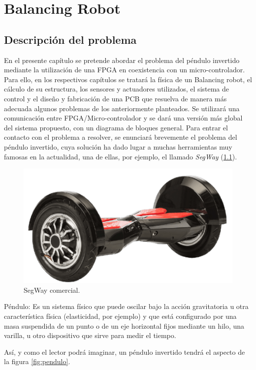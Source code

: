 \chapter{Balancing Robot}\label{sec: BalancingRobot}
\section{Descripción del problema}
En el presente capítulo se pretende abordar el problema del péndulo invertido mediante la utilización de una FPGA en coexistencia con un micro-controlador. Para ello, en los respectivos capítulos se tratará la física de un Balancing robot, el cálculo de su estructura, los sensores y actuadores utilizados, el sistema de control y el diseño y fabricación de una PCB que resuelva de manera más adecuada algunos problemas de los anteriormente planteados. Se utilizará una comunicación entre FPGA/Micro-controlador y se dará una versión más global del sistema propuesto, con un diagrama de bloques general. \newline
\newline Para entrar el contacto con el problema a resolver, se enunciará brevemente el problema del péndulo invertido, cuya solución ha dado lugar a muchas herramientas muy famosas en la actualidad, una de ellas, por ejemplo, el llamado \textit{SegWay} (\ref{fig:segway}).

\begin{figure}[H]
	\center
	\includegraphics[trim = 0mm 0mm 0mm 0mm, clip,scale=0.4]{imagenes/Balancing_robot/segway}
	\caption{SegWay comercial.}
	\label{fig:segway}
\end{figure}


\begin{definicion}Péndulo: Es un sistema físico que puede oscilar bajo la acción gravitatoria u otra característica física (elasticidad, por ejemplo) y que está configurado por una masa suspendida de un punto o de un eje horizontal fijos mediante un hilo, una varilla, u otro dispositivo que sirve para medir el tiempo. \newline
\end{definicion}
Así, y como el lector podrá imaginar, un péndulo invertido tendrá el aspecto de la figura \ref{fig:pendulo}. 

